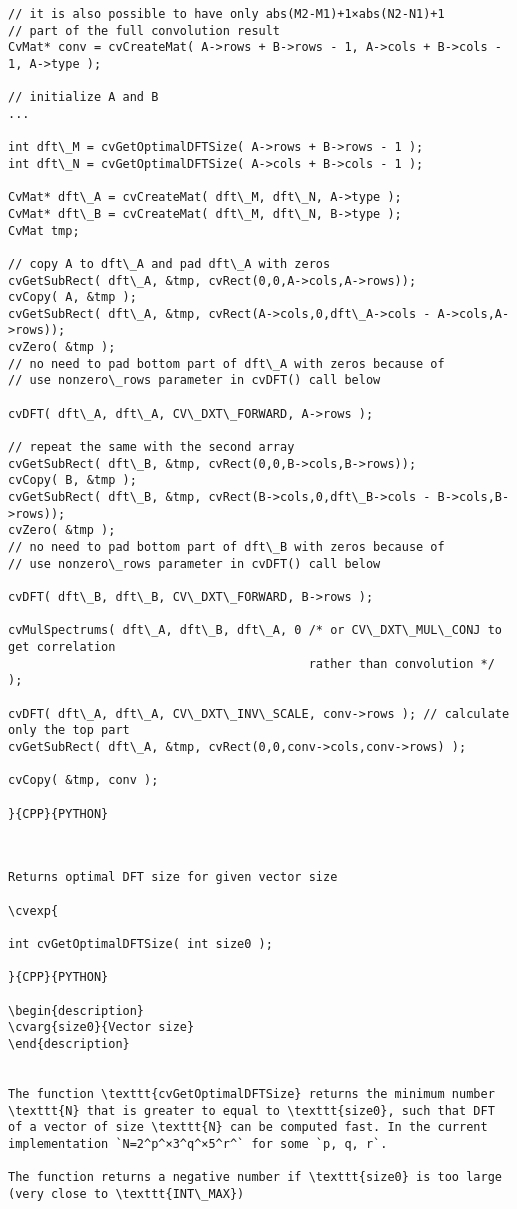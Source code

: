 \begin{verbatim}
// it is also possible to have only abs(M2-M1)+1×abs(N2-N1)+1
// part of the full convolution result
CvMat* conv = cvCreateMat( A->rows + B->rows - 1, A->cols + B->cols - 1, A->type );

// initialize A and B
...

int dft\_M = cvGetOptimalDFTSize( A->rows + B->rows - 1 );
int dft\_N = cvGetOptimalDFTSize( A->cols + B->cols - 1 );

CvMat* dft\_A = cvCreateMat( dft\_M, dft\_N, A->type );
CvMat* dft\_B = cvCreateMat( dft\_M, dft\_N, B->type );
CvMat tmp;

// copy A to dft\_A and pad dft\_A with zeros
cvGetSubRect( dft\_A, &tmp, cvRect(0,0,A->cols,A->rows));
cvCopy( A, &tmp );
cvGetSubRect( dft\_A, &tmp, cvRect(A->cols,0,dft\_A->cols - A->cols,A->rows));
cvZero( &tmp );
// no need to pad bottom part of dft\_A with zeros because of
// use nonzero\_rows parameter in cvDFT() call below

cvDFT( dft\_A, dft\_A, CV\_DXT\_FORWARD, A->rows );

// repeat the same with the second array
cvGetSubRect( dft\_B, &tmp, cvRect(0,0,B->cols,B->rows));
cvCopy( B, &tmp );
cvGetSubRect( dft\_B, &tmp, cvRect(B->cols,0,dft\_B->cols - B->cols,B->rows));
cvZero( &tmp );
// no need to pad bottom part of dft\_B with zeros because of
// use nonzero\_rows parameter in cvDFT() call below

cvDFT( dft\_B, dft\_B, CV\_DXT\_FORWARD, B->rows );

cvMulSpectrums( dft\_A, dft\_B, dft\_A, 0 /* or CV\_DXT\_MUL\_CONJ to get correlation
                                          rather than convolution */ );

cvDFT( dft\_A, dft\_A, CV\_DXT\_INV\_SCALE, conv->rows ); // calculate only the top part
cvGetSubRect( dft\_A, &tmp, cvRect(0,0,conv->cols,conv->rows) );

cvCopy( &tmp, conv );

}{CPP}{PYTHON}


\end{verbatim}
\begin{verbatim}

Returns optimal DFT size for given vector size

\cvexp{

int cvGetOptimalDFTSize( int size0 );

}{CPP}{PYTHON}

\begin{description}
\cvarg{size0}{Vector size}
\end{description}


The function \texttt{cvGetOptimalDFTSize} returns the minimum number \texttt{N} that is greater to equal to \texttt{size0}, such that DFT of a vector of size \texttt{N} can be computed fast. In the current implementation `N=2^p^×3^q^×5^r^` for some `p, q, r`.

The function returns a negative number if \texttt{size0} is too large (very close to \texttt{INT\_MAX})


\end{verbatim}
